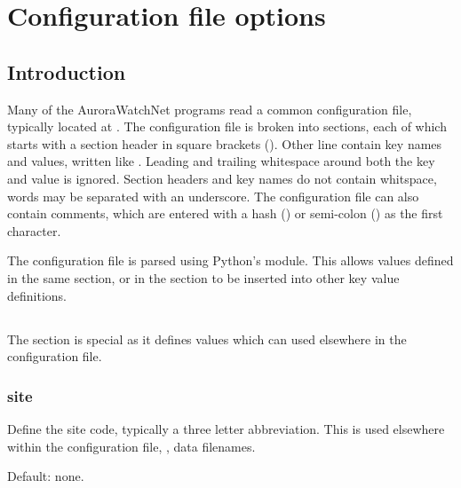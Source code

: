 \chapter{Configuration file options}

\newcommand{\configexample}[1]{\examplebox{#1}}

\section{Introduction}
Many of the AuroraWatchNet programs read a common configuration file,
typically located at . The configuration file
is broken into sections, each of which starts with a section header in
square brackets (). Other line contain key names
and values, written like . Leading and trailing
whitespace around both the key and value is ignored. Section headers
and key names do not contain whitspace, words may be separated with an
underscore. The configuration file can also contain comments, which
are entered with a hash (\code{\#}) or semi-colon (\code{;}) as the
first character.

The configuration file is parsed using Python's 
module. This allows values defined in the same section, or in the
\code{[DEFAULT]} section to be inserted into other key value
definitions.

\section{\code{[DEFAULT]}}

The \code{[DEFAULT]} section is special as it defines values which can
used elsewhere in the configuration file.

\subsection{site}
Define the site code, typically a three letter abbreviation. This is
used elsewhere within the configuration file, \eg, data filenames.

Default: none.

\configexample{\code{site = lan1}}

\section{\code{[awnettextdata]}}


